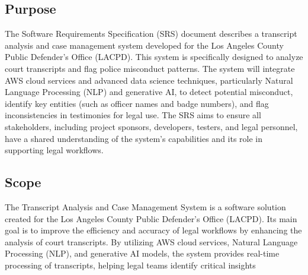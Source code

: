 \documentclass[12pt]{article}
\begin{document}
\subsection{Purpose}
The Software Requirements Specification (SRS) document describes a transcript analysis
 and case management system developed for the Los Angeles County Public Defender’s Office
 (LACPD). This system is specifically designed to analyze court transcripts and flag police
 misconduct patterns. The system will integrate AWS cloud services and advanced data science
 techniques, particularly Natural Language Processing (NLP) and generative AI, to detect
 potential misconduct, identify key entities (such as officer names and badge numbers), and flag
 inconsistencies in testimonies for legal use.
 The SRS aims to ensure all stakeholders, including project sponsors, developers, testers,
 and legal personnel, have a shared understanding of the system’s capabilities and its role in
 supporting legal workflows.


\subsection{Scope}
 The Transcript Analysis and Case Management System is a software solution created for
 the Los Angeles County Public Defender’s Office (LACPD). Its main goal is to improve the
 efficiency and accuracy of legal workflows by enhancing the analysis of court transcripts. By
 utilizing AWS cloud services, Natural Language Processing (NLP), and generative AI models,
 the system provides real-time processing of transcripts, helping legal teams identify critical
 insights
\end{document}

